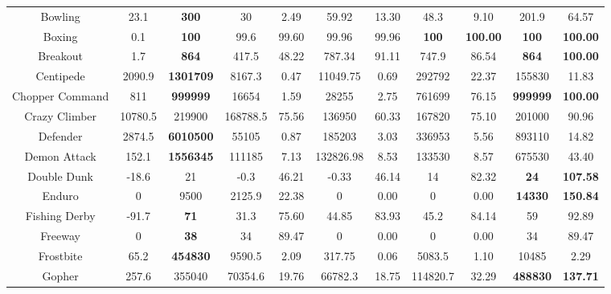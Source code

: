 \documentclass[nohyperref]{article}
\newcommand{\best}[1]{\textbf{#1}}
\theoremstyle{plain}
\begin{document}
\begin{table}[!hb]
\begin{center}
\begin{tabular}{|c| c| c| c c| c c| c c| c c| }
 Bowling            & 23.1      & \textbf{300}       & 30       &2.49    & 59.92      & 13.30      & 48.3    & 9.10      &201.9             &64.57    \\
 Boxing             & 0.1       & \textbf{100}       & 99.6     &99.60   & 99.96      & 99.96      & \textbf{100}     & \textbf{100.00}    &\best{100}        &\best{100.00 }     \\
 Breakout           & 1.7       & \textbf{864}       & 417.5    &48.22   & 787.34     & 91.11      & 747.9   & 86.54     &\best{864}        &\best{100.00 }  \\
 Centipede          & 2090.9    & \textbf{1301709}   & 8167.3   &0.47    & 11049.75   & 0.69       & 292792  & 22.37     &155830            &11.83          \\
 Chopper Command    & 811       & \textbf{999999}    & 16654    &1.59    & 28255      & 2.75       & 761699  & 76.15     &\best{999999}     &\best{100.00 } \\
 Crazy Climber      & 10780.5   & 219900    & 168788.5 &75.56   & 136950     & 60.33      & 167820  & 75.10     &201000            &90.96          \\
 Defender           & 2874.5    & \textbf{6010500}   & 55105    &0.87    & 185203     & 3.03       & 336953  & 5.56      &893110            &14.82         \\
 Demon Attack       & 152.1     & \textbf{1556345}   & 111185   &7.13    & 132826.98  & 8.53       & 133530  & 8.57      &675530            &43.40          \\
 Double Dunk        & -18.6     & 21        & -0.3     &46.21   & -0.33      & 46.14      & 14      & 82.32     &\best{24}                  &\best{107.58 }   \\
 Enduro             & 0         & 9500      & 2125.9   &22.38   & 0          & 0.00       & 0       & 0.00      &\best{14330}               &\best{150.84  } \\
 Fishing Derby      & -91.7     & \textbf{71}        & 31.3     &75.60   & 44.85      & 83.93      & 45.2    & 84.14     &59                &92.89         \\
 Freeway            & 0         & \textbf{38}        & 34       &89.47   & 0          & 0.00       & 0       & 0.00      &34                &89.47          \\
 Frostbite          & 65.2      & \textbf{454830}    & 9590.5   &2.09    & 317.75     & 0.06       & 5083.5  & 1.10      &10485             &2.29           \\
 Gopher             & 257.6     & 355040    & 70354.6  &19.76   & 66782.3    & 18.75      & 114820.7& 32.29     &\best{488830}              &\best{137.71 } \\

\end{tabular}
\end{center}
\end{table}
\end{document}
